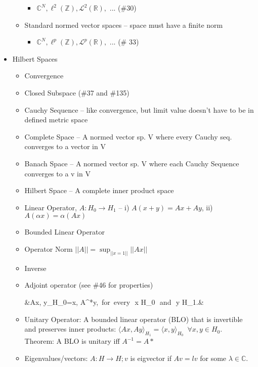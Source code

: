 \documentclass{article}
\begin{document}
\begin{itemize}
\begin{itemize}
		\begin{itemize}
		\item $\mathbb{C}^N, \ell^2(\mathbb{Z}), \mathcal{L}^2(\mathbb{R}),$ ... (\#30)
		\end{itemize}
	\item Standard normed vector spaces -- {\color{gray} space must have a finite norm}
		\begin{itemize}
			\item $\mathbb{C}^N, \ell^p(\mathbb{Z}), \mathcal{L}^p(\mathbb{R}),$ ... (\# 33)
 		\end{itemize}
	\end{itemize}
\item Hilbert Spaces
	\begin{itemize}
	\item Convergence
	\item Closed Subspace (\#37 and \#135)
	\item Cauchy Sequence -- {like convergence, but limit value doesn't have to be in defined metric space}
	\item Complete Space -- {\color{gray} A normed vector sp. V where every Cauchy seq. converges to a vector in V}
	\item Banach Space -- {\color{gray} A normed vector sp. V where each Cauchy Sequence converges to a v in V}
	\item Hilbert Space -- {\color{gray} A complete inner product space}
	\item Linear Operator, $A: H_0 \rightarrow H_1$ -- {i) $A(x+y) = Ax+Ay$, ii) $A(\alpha x)=\alpha(Ax)$ }
	\item Bounded Linear Operator
	\item Operator Norm {\color{gray} $||A|| = \sup_{||x=1||}||Ax||$}
	\item Inverse
	\item Adjoint operator (see \#46 for properties)	\begin{flalign}
	&\langle Ax, y\rangle_{H_0}=\langle x, A^{*}y\rangle,\, \mbox{for every}\,\, x \in H_0 \,\,\mbox{and}\,\, y \in H_1.&
	\end{flalign}
	\item Unitary Operator: A bounded linear operator (BLO) that is invertible and preserves inner products: $\langle Ax,Ay\rangle_{H_1} = \langle x,y \rangle_{H_0}\,\,\,\forall
	x,y \in H_0$.  \\
	Theorem: A BLO is unitary iff $A^{-1}=A*$
	\item Eigenvalues/vectors: $A: H\rightarrow H; v $ is eigvector if $Av=lv$ for some $\lambda \in \mathbb{C}$.

\end{itemize}
\end{itemize}
\end{document}
